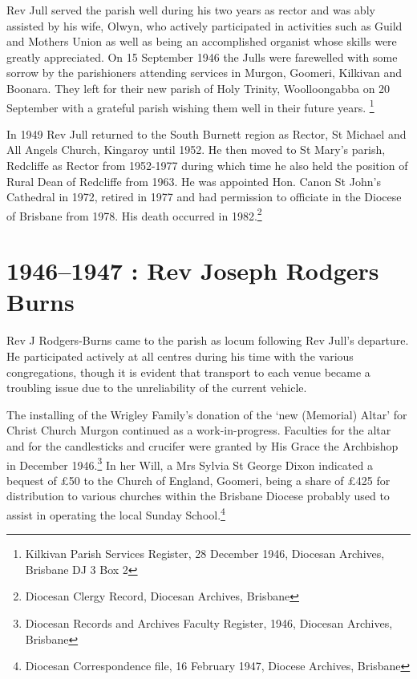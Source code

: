 Rev Jull served the parish well during his two years as rector and was ably assisted by his wife, Olwyn, who actively participated in activities such as Guild and Mothers Union as well as being an accomplished organist whose skills were greatly appreciated. On 15 September 1946 the Julls were farewelled with some sorrow by the parishioners attending services in Murgon, Goomeri, Kilkivan and Boonara. They left for their new parish of Holy Trinity, Woolloongabba on 20 September with a grateful parish wishing them well in their future years. \footnote{Kilkivan Parish Services Register, 28 December 1946, Diocesan Archives, Brisbane DJ 3 Box 2}

In 1949 Rev Jull returned to the South Burnett region as Rector, St Michael and All Angels Church, Kingaroy until 1952. He then moved to St Mary's parish, Redcliffe as Rector from 1952-1977 during which time he also held the position of Rural Dean of Redcliffe from 1963. He was appointed Hon. Canon St John's Cathedral in 1972, retired in 1977 and had permission to officiate in the Diocese of Brisbane from 1978. His death occurred in 1982.\footnote{Diocesan Clergy Record, Diocesan Archives, Brisbane}

\hypertarget{rev-joseph-rodgers-burns}{%
\section{1946--1947 : Rev Joseph Rodgers Burns}\label{rev-joseph-rodgers-burns}}

Rev J Rodgers-Burns came to the parish as locum following Rev Jull's departure. He participated actively at all centres during his time with the various congregations, though it is evident that transport to each venue became a troubling issue due to the unreliability of the current vehicle.

The installing of the Wrigley Family's donation of the `new (Memorial) Altar' for Christ Church Murgon continued as a work-in-progress. Faculties for the altar and for the candlesticks and crucifer were granted by His Grace the Archbishop in December 1946.\footnote{Diocesan Records and Archives Faculty Register, 1946, Diocesan Archives, Brisbane} In her Will, a Mrs Sylvia St George Dixon indicated a bequest of £50 to the Church of England, Goomeri, being a share of £425 for distribution to various churches within the Brisbane Diocese probably used to assist in operating the local Sunday School.\footnote{Diocesan Correspondence file, 16 February 1947, Diocese Archives, Brisbane}

